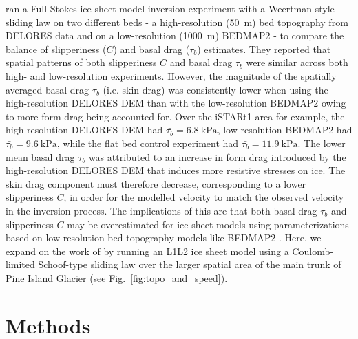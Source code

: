 \citet{Kyrke-SmithRelevanceDetailBasal2018} ran a Full Stokes ice sheet model inversion experiment with a Weertman-style sliding law on two different beds - a high-resolution (\SI{50}{\metre}) bed topography from DELORES data \citep{BinghamDiverselandscapesPine2017} and on a low-resolution (\SI{1000}{\metre}) BEDMAP2 \citep{FretwellBedmap2improvedice2013} - to compare the balance of slipperiness ($C$) and basal drag ($\tau_b$) estimates.
They reported that spatial patterns of both slipperiness $C$ and basal drag $\tau_b$ were similar across both high- and low-resolution experiments.
However, the magnitude of the spatially averaged basal drag $\tau_b$ (i.e. skin drag) was consistently lower when using the high-resolution DELORES \gls{DEM} than with the low-resolution BEDMAP2 owing to more form drag being accounted for.
Over the iSTARt1 area for example, the high-resolution DELORES \gls{DEM} had $\bar{\tau_b} = \SI{6.8}{\kilo\pascal}$, low-resolution BEDMAP2 had $\bar{\tau_b} = \SI{9.6}{\kilo\pascal}$, while the flat bed control experiment had $\bar{\tau_b} = \SI{11.9}{\kilo\pascal}$.
The lower mean basal drag $\bar{\tau_b}$ was attributed to an increase in form drag introduced by the high-resolution DELORES DEM that induces more resistive stresses on ice.
The skin drag component must therefore decrease, corresponding to a lower slipperiness $C$, in order for the modelled velocity to match the observed velocity in the inversion process.
The implications of this are that both basal drag $\tau_b$ and slipperiness $C$ may be overestimated for ice sheet models using parameterizations based on low-resolution bed topography models like BEDMAP2 \citep{Kyrke-SmithRelevanceDetailBasal2018}.
Here, we expand on the work of \citet{Kyrke-SmithRelevanceDetailBasal2018} by running an L1L2 ice sheet model \citep[ISSM;][]{LarourContinentalscalehigh2012} using a Coulomb-limited Schoof-type sliding law \citep{JoughinRegularizedCoulombFriction2019,Schoofeffectcavitationglacier2005} over the larger spatial area of the main trunk of Pine Island Glacier (see Fig.~\ref{fig:topo_and_speed}).


\clearpage
\section{Methods} \label{sec:methods}

